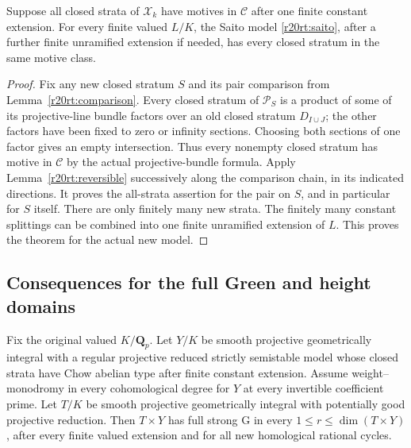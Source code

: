 \begin{theorem}
\label{r20rt:ramified}
Suppose all closed strata of $\mathcal X_k$ have motives in
$\mathcal C$ after one finite constant extension.  For every
finite valued $L/K$, the Saito model \eqref{r20rt:saito},
after a further finite unramified extension if needed, has
every closed stratum in the same motive class.
\end{theorem}

\begin{proof}
Fix any new closed stratum $S$ and its pair comparison from
Lemma~\ref{r20rt:comparison}.  Every closed stratum of
$\mathcal P_S$ is a product of some of its projective-line
bundle factors over an old closed stratum $D_{I\cup J}$;
the other factors have been fixed to zero or infinity
sections.  Choosing both sections of one factor gives an
empty intersection.  Thus every nonempty closed stratum
has motive in $\mathcal C$ by the actual projective-bundle
formula.  Apply Lemma~\ref{r20rt:reversible} successively
along the comparison chain, in its indicated directions.
It proves the all-strata assertion for the pair on $S$,
and in particular for $S$ itself.  There are only finitely
many new strata.  The finitely many constant splittings
can be combined into one finite unramified extension of
$L$.  This proves the theorem for the actual new model.
\end{proof}

\subsection{Consequences for the full Green and height domains}

\begin{theorem}
\label{r20rt:green}
Fix the original valued $K/\mathbf Q_p$.  Let $Y/K$ be
smooth projective geometrically integral with a regular
projective reduced strictly semistable model whose closed
strata have Chow abelian type after finite constant extension.
Assume weight--monodromy in every cohomological degree for
$Y$ at every invertible coefficient prime.  Let $T/K$ be
smooth projective geometrically integral with potentially
good projective reduction.  Then $T\times Y$ has full
strong G in every $1\leq r\leq\dim(T\times Y)$, after
every finite valued extension and for all new homological
rational cycles.
\end{theorem}

